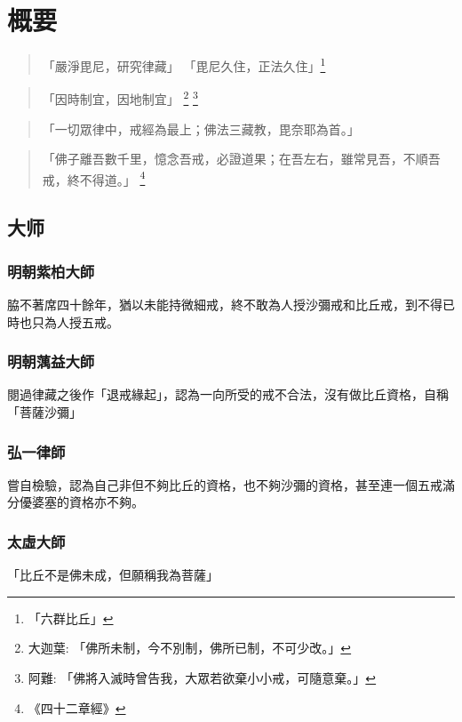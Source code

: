 \section{概要}

\begin{quote}
  「嚴淨毘尼，研究律藏」
  「毘尼久住，正法久住」\footnote{「六群比丘」}
\end{quote}

\begin{quote}
  「因時制宜，因地制宜」
  \footnote{大迦葉: 「佛所未制，今不別制，佛所已制，不可少改。」}
  \footnote{阿難: 「佛將入滅時曾告我，大眾若欲棄小小戒，可隨意棄。」}
\end{quote}

\begin{quote}
  「一切眾律中，戒經為最上；佛法三藏教，毘奈耶為首。」
\end{quote}

\begin{quote}
  「佛子離吾數千里，憶念吾戒，必證道果；在吾左右，雖常見吾，不順吾戒，終不得道。」
  \footnote{《四十二章經》}
\end{quote}


\subsection{大师}
\subsubsection{明朝紫柏大師} 脇不著席四十餘年，猶以未能持微細戒，終不敢為人授沙彌戒和比丘戒，到不得已時也只為人授五戒。
\subsubsection{明朝蕅益大師} 閱過律藏之後作「退戒緣起」，認為一向所受的戒不合法，沒有做比丘資格，自稱「菩薩沙彌」
\subsubsection{弘一律師} 嘗自檢驗，認為自己非但不夠比丘的資格，也不夠沙彌的資格，甚至連一個五戒滿分優婆塞的資格亦不夠。
\subsubsection{太虛大師} 「比丘不是佛未成，但願稱我為菩薩」
